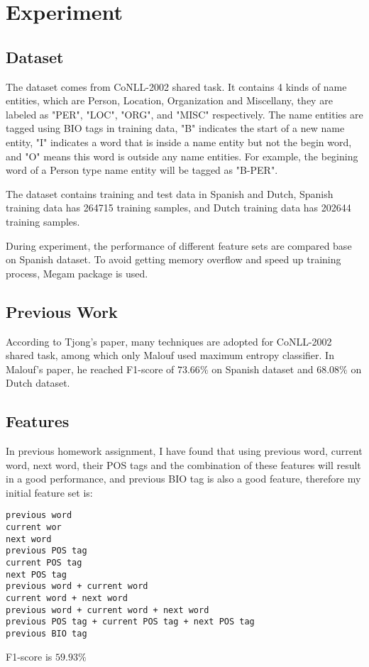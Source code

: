 \documentclass[10pt,twocolumn,letterpaper]{article}
\begin{document}
\section{Experiment}

\subsection{Dataset}
The dataset comes from CoNLL-2002 shared task. It contains 4 kinds of name entities, which are Person, Location, Organization and Miscellany, they are labeled as "PER", "LOC", "ORG", and "MISC" respectively. The name entities are tagged using BIO tags in training data, "B" indicates the start of a new name entity, "I" indicates a word that is inside a name entity but not the begin word, and "O" means this word is outside any name entities. For example, the begining word of a Person type name entity will be tagged as "B-PER".
\par The dataset contains training and test data in Spanish and Dutch, Spanish training data has 264715 training samples, and Dutch training data has 202644 training samples.
\par During experiment, the performance of different feature sets are compared base on Spanish dataset. To avoid getting memory overflow and speed up training process, Megam package is used.

\subsection{Previous Work}
According to Tjong's paper\cite{Tjong}, many techniques are adopted for CoNLL-2002 shared task, among which only Malouf\cite{Malouf} used maximum entropy classifier. In Malouf's paper, he reached F1-score of $73.66\%$ on Spanish dataset and $68.08\%$ on Dutch dataset.

\subsection{Features}
\par In previous homework assignment, I have found that using previous word, current word, next word, their POS tags and the combination of these features will result in a good performance, and previous BIO tag is also a good feature, therefore my initial feature set is: 
\begin{lstlisting}
previous word
current wor
next word
previous POS tag
current POS tag
next POS tag
previous word + current word
current word + next word
previous word + current word + next word
previous POS tag + current POS tag + next POS tag
previous BIO tag
\end{lstlisting}
F1-score is $59.93\%$
\end{document}
